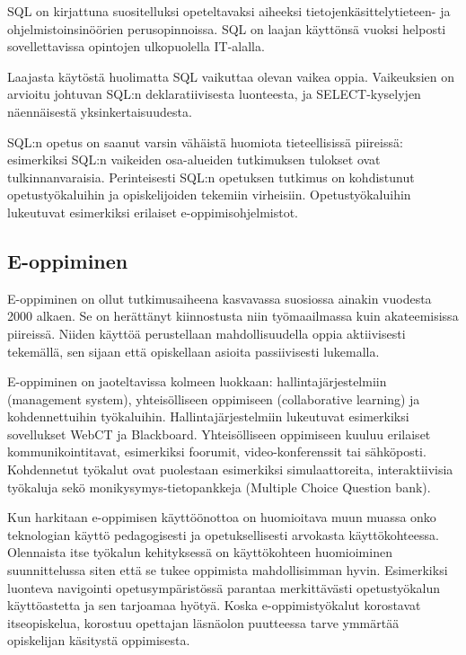 \documentclass[finnish,twoside,openright]{HYgraduMLDS}
\begin{document}
SQL on kirjattuna suositelluksi opeteltavaksi aiheeksi tietojenkäsittelytieteen-\cite{acm2013currilum} ja ohjelmistoinsinöörien\cite{swebok} perusopinnoissa. SQL on laajan käyttönsä vuoksi helposti sovellettavissa opintojen ulkopuolella IT-alalla.

Laajasta käytöstä huolimatta SQL vaikuttaa olevan vaikea oppia. Vaikeuksien on arvioitu johtuvan SQL:n deklaratiivisesta luonteesta, ja SELECT-kyselyjen näennäisestä yksinkertaisuudesta\cite{sadiq2004sqlator}.

SQL:n opetus on saanut varsin vähäistä huomiota tieteellisissä piireissä\cite{Taipalus:2019:EFS:3287324.3287359}: esimerkiksi SQL:n vaikeiden osa-alueiden tutkimuksen tulokset ovat tulkinnanvaraisia\cite{Taipalus:2019:EFS:3287324.3287359}. Perinteisesti SQL:n opetuksen tutkimus on kohdistunut opetustyökaluihin ja opiskelijoiden tekemiin virheisiin\cite{Taipalus:2019:EFS:3287324.3287359}. Opetustyökaluihin lukeutuvat esimerkiksi erilaiset e-oppimisohjelmistot.

\subsection{E-oppiminen}

E-oppiminen on ollut tutkimusaiheena kasvavassa suosiossa ainakin vuodesta 2000 alkaen. Se on herättänyt kiinnostusta niin työmaailmassa kuin akateemisissa piireissä. Niiden käyttöä perustellaan mahdollisuudella oppia aktiivisesti tekemällä, sen sijaan että opiskellaan asioita passiivisesti lukemalla\cite{Brusilovsky:2010:LSP:1656255.1656257}. 

E-oppiminen on jaoteltavissa kolmeen luokkaan\cite{sadiq2004sqlator}: hallintajärjestelmiin (management system), yhteisölliseen oppimiseen (collaborative learning) ja kohdennettuihin työkaluihin. Hallintajärjestelmiin lukeutuvat esimerkiksi sovellukset WebCT ja Blackboard. Yhteisölliseen oppimiseen kuuluu erilaiset kommunikointitavat, esimerkiksi foorumit, video-konferenssit tai sähköposti. Kohdennetut työkalut ovat puolestaan esimerkiksi simulaattoreita, interaktiivisia työkaluja sekö monikysymys-tietopankkeja (Multiple Choice Question bank).

Kun harkitaan e-oppimisen käyttöönottoa on huomioitava muun muassa onko teknologian käyttö pedagogisesti ja opetuksellisesti arvokasta käyttökohteessa\cite{sadiq2004sqlator}. Olennaista itse työkalun kehityksessä on käyttökohteen huomioiminen suunnittelussa siten että se tukee oppimista mahdollisimman hyvin. Esimerkiksi luonteva navigointi opetusympäristössä parantaa merkittävästi opetustyökalun käyttöastetta ja sen tarjoamaa hyötyä\cite{Brusilovsky:2010:LSP:1656255.1656257}. Koska e-oppimistyökalut korostavat itseopiskelua, korostuu opettajan läsnäolon puutteessa tarve ymmärtää opiskelijan käsitystä oppimisesta\cite{sadiq2004sqlator}.
\end{document}
